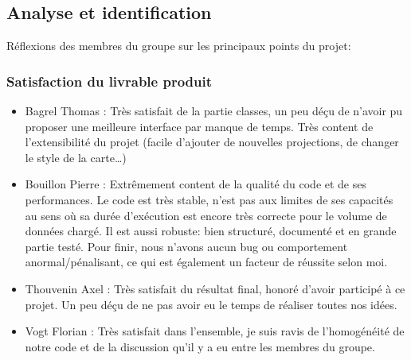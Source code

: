 \documentclass[a4paper, 12pt]{report}
\begin{document}
\subsection*{Analyse et identification}
Réflexions des membres du groupe sur les principaux points du projet:

\subsubsection*{Satisfaction du livrable produit}
\begin{itemize}

\item
  Bagrel Thomas :
  Très satisfait de la partie classes, un peu déçu de n’avoir pu proposer une meilleure interface par manque de temps. Très content de l’extensibilité du projet (facile d’ajouter de nouvelles projections, de changer le style de la carte…)
\item
  Bouillon Pierre :
  Extrêmement content de la qualité du code et de ses performances. Le code est très stable, n'est pas aux limites de ses capacités au sens où sa durée d'exécution est encore très correcte pour le volume de données chargé. Il est aussi robuste: bien structuré, documenté et en grande partie testé. Pour finir, nous n'avons aucun bug ou comportement anormal/pénalisant, ce qui est également un facteur de réussite selon moi.
\item
  Thouvenin Axel :
  Très satisfait du résultat final, honoré d’avoir participé à ce projet. Un peu déçu de ne pas avoir eu le temps de réaliser toutes nos idées.
\item
  Vogt Florian :
  Très satisfait dans l’ensemble, je suis ravis de l'homogénéité de notre code et de la discussion qu’il y a eu entre les membres du groupe.
\end{itemize}
\end{document}
